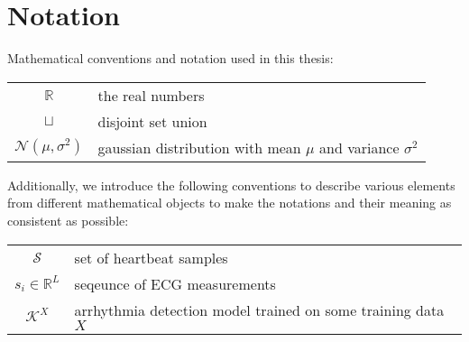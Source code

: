 
\section*{Notation}
Mathematical conventions and notation used in this thesis:

\begin{center}
    \renewcommand{\arraystretch}{1.5}
    \begin{tabular}{ c l }
        
        $\mathbb{R}$ & the real numbers \\
        $\sqcup$ & disjoint set union \\
        $\mathcal{N}(\mu, \sigma^2)$ & gaussian distribution with mean $\mu$ and variance $\sigma^2$
    \end{tabular}
\end{center}

Additionally, we introduce the following conventions to describe various elements from different mathematical objects to make the notations and their meaning as consistent as possible:

\begin{center}
    \renewcommand{\arraystretch}{1.5}
    \begin{tabular}{c l}
        $\mathcal{S}$ & set of heartbeat samples \\
        $s_i \in \mathbb{R}^L$ & seqeunce of ECG measurements \\
        $\mathcal{K}^X$ & arrhythmia detection model trained on some training data $X$


    \end{tabular}
\end{center}
